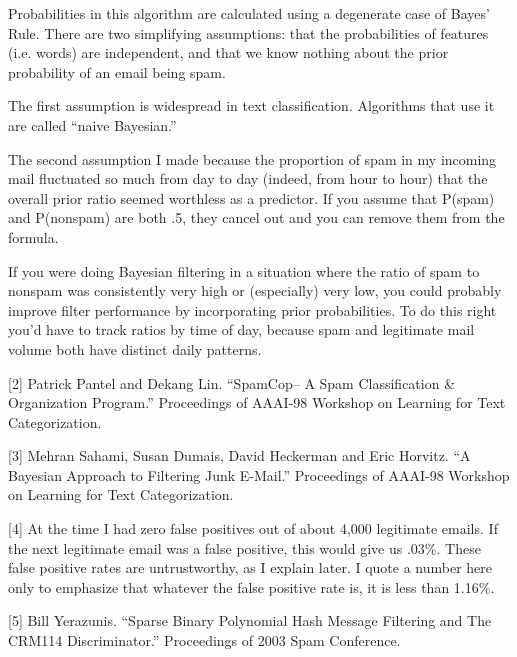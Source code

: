 Probabilities
                  in this algorithm are calculated using a degenerate case of
                  Bayes' Rule. There are two simplifying assumptions: that the
                  probabilities of features (i.e. words) are independent, and
                  that we know nothing about the prior probability of an email
                  being spam.

The first assumption is widespread in
                  text classification. Algorithms that use it are called ``naive
                  Bayesian.''

The second assumption I made because
                  the proportion of spam in my incoming mail fluctuated so much
                  from day to day (indeed, from hour to hour) that the overall
                  prior ratio seemed worthless as a predictor. If you assume
                  that P(spam) and P(nonspam) are both .5, they cancel out and
                  you can remove them from the formula.

If you were
                  doing Bayesian filtering in a situation where the ratio of
                  spam to nonspam was consistently very high or (especially)
                  very low, you could probably improve filter performance by
                  incorporating prior probabilities. To do this right you'd have
                  to track ratios by time of day, because spam and legitimate
                  mail volume both have distinct daily patterns.

[2]
                  Patrick Pantel and Dekang Lin. ``SpamCop-- A Spam
                  Classification \& Organization Program.'' Proceedings of
                  AAAI-98 Workshop on Learning for Text Categorization.

[3]
                  Mehran Sahami, Susan Dumais, David Heckerman and Eric Horvitz.
                  ``A Bayesian Approach to Filtering Junk E-Mail.'' Proceedings
                  of AAAI-98 Workshop on Learning for Text Categorization.

[4]
                  At the time I had zero false positives out of about 4,000
                  legitimate emails. If the next legitimate email was a false
                  positive, this would give us .03\%. These false positive rates
                  are untrustworthy, as I explain later. I quote a number here
                  only to emphasize that whatever the false positive rate is, it
                  is less than 1.16\%.
                  

[5]
                  Bill Yerazunis. ``Sparse Binary Polynomial Hash Message
                  Filtering and The CRM114 Discriminator.'' Proceedings of 2003
                  Spam Conference.

